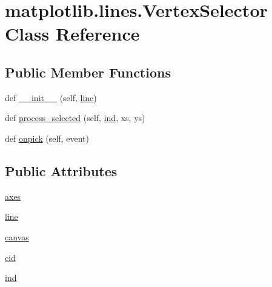 \hypertarget{classmatplotlib_1_1lines_1_1VertexSelector}{}\section{matplotlib.\+lines.\+Vertex\+Selector Class Reference}
\label{classmatplotlib_1_1lines_1_1VertexSelector}
\subsection*{Public Member Functions}
\begin{DoxyCompactItemize}
\item 
def \hyperlink{classmatplotlib_1_1lines_1_1VertexSelector_a135457da4e0e253c2c0b94a8a9bbc220}{\+\_\+\+\_\+init\+\_\+\+\_\+} (self, \hyperlink{classmatplotlib_1_1lines_1_1VertexSelector_a74245b30d66270e165f302f7ddb995fc}{line})
\item 
def \hyperlink{classmatplotlib_1_1lines_1_1VertexSelector_a5efff34258b2ec438ec05d5bce7585c1}{process\+\_\+selected} (self, \hyperlink{classmatplotlib_1_1lines_1_1VertexSelector_a118f7be2b97d6f8d4ce743c49ed1c43c}{ind}, xs, ys)
\item 
def \hyperlink{classmatplotlib_1_1lines_1_1VertexSelector_a92fc854e8adaf143b3867f5e20ad3eed}{onpick} (self, event)
\end{DoxyCompactItemize}
\subsection*{Public Attributes}
\begin{DoxyCompactItemize}
\item 
\hyperlink{classmatplotlib_1_1lines_1_1VertexSelector_a0d9aff6f5db1c9a68a91ced903b6afdb}{axes}
\item 
\hyperlink{classmatplotlib_1_1lines_1_1VertexSelector_a74245b30d66270e165f302f7ddb995fc}{line}
\item 
\hyperlink{classmatplotlib_1_1lines_1_1VertexSelector_aa657e50fc8e250f57af1feb2ecc743d4}{canvas}
\item 
\hyperlink{classmatplotlib_1_1lines_1_1VertexSelector_a90984a02f0877a66c2ce62b28d77b97d}{cid}
\item 
\hyperlink{classmatplotlib_1_1lines_1_1VertexSelector_a118f7be2b97d6f8d4ce743c49ed1c43c}{ind}
\end{DoxyCompactItemize}


